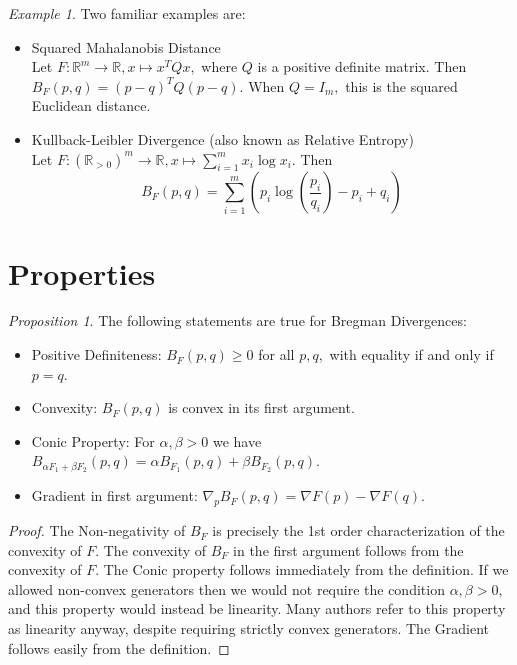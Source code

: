 \documentclass[BSc]{usydthesis}
\numberwithin{equation}{chapter}
\theoremstyle{remark}
\newtheorem{Proposition}[equation]{Proposition}
\newtheorem{Example}[equation]{Example}
\begin{document}
\begin{Example} Two familiar examples are:
 \begin{itemize}
 \item Squared Mahalanobis Distance
 \\
 Let $F:\mathbb{R}^m \to \mathbb{R}, x \mapsto x^TQx,$ where $Q$ is a positive definite matrix. Then $B_F(p,q) = (p-q)^T Q (p-q).$ When $Q = I_m,$ this is the squared Euclidean distance.
 
 \item Kullback-Leibler Divergence (also known as Relative Entropy) 
 \\
 Let $F:(\mathbb{R}_{>0})^m \to \mathbb{R}, x \mapsto \sum_{i=1}^m x_i \log x_i.$ Then $$B_F(p,q) = \sum_{i=1}^m  \left( p_i \log\left(\frac{p_i}{q_i}\right) -p_i + q_i\right)$$ 
\end{itemize}
\end{Example}
\section{Properties}
\begin{Proposition}{The following statements are true for Bregman Divergences:}\\
 \begin{itemize}
  \item Positive Definiteness: $B_F(p,q)\geq 0$ for all $p,q,$ with equality if and only if $p=q.$
  \item Convexity: $B_F(p,q)$ is convex in its first argument.
  \item Conic Property: For $\alpha, \beta>0$ we have $B_{\alpha F_1 + \beta F_2}(p,q) = \alpha B_{F_1}(p,q) + \beta B_{F_2}(p,q).$
  \item Gradient in first argument: $\nabla_p B_F(p,q) = \nabla F(p) - \nabla F(q).$
  
 \end{itemize}

\end{Proposition}

\begin{proof}
 The Non-negativity of $B_F$ is precisely the 1st order characterization of the convexity of $F.$ The convexity of $B_F$ in the first argument follows from the convexity of $F.$ The Conic property follows immediately from the definition. If we allowed non-convex generators then we would not require the condition $\alpha, \beta>0,$ and this property would instead be linearity. Many authors refer to this property as linearity anyway, despite requiring strictly convex generators. The Gradient follows easily from the definition.
\end{proof}
\end{document}
